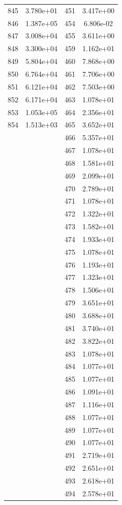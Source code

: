 \documentclass[12pt]{article}
\begin{document}
\begin{longtable}{@{}cccc@{}}
845 & 3.780e+01 & 451 & 3.417e+00 \\
846 & 1.387e+05 & 454 & 6.806e-02 \\
847 & 3.008e+04 & 455 & 3.611e+00 \\
848 & 3.300e+04 & 459 & 1.162e+01 \\
849 & 5.804e+04 & 460 & 7.868e+00 \\
850 & 6.764e+04 & 461 & 7.706e+00 \\
851 & 6.121e+04 & 462 & 7.503e+00 \\
852 & 6.171e+04 & 463 & 1.078e+01 \\
853 & 1.053e+05 & 464 & 2.356e+01 \\
854 & 1.513e+03 & 465 & 3.652e+01 \\
 &  & 466 & 5.357e+01 \\
 &  & 467 & 1.078e+01 \\
 &  & 468 & 1.581e+01 \\
 &  & 469 & 2.099e+01 \\
 &  & 470 & 2.789e+01 \\
 &  & 471 & 1.078e+01 \\
 &  & 472 & 1.322e+01 \\
 &  & 473 & 1.582e+01 \\
 &  & 474 & 1.933e+01 \\
 &  & 475 & 1.078e+01 \\
 &  & 476 & 1.193e+01 \\
 &  & 477 & 1.323e+01 \\
 &  & 478 & 1.506e+01 \\
 &  & 479 & 3.651e+01 \\
 &  & 480 & 3.688e+01 \\
 &  & 481 & 3.740e+01 \\
 &  & 482 & 3.822e+01 \\
 &  & 483 & 1.078e+01 \\
 &  & 484 & 1.077e+01 \\
 &  & 485 & 1.077e+01 \\
 &  & 486 & 1.091e+01 \\
 &  & 487 & 1.116e+01 \\
 &  & 488 & 1.077e+01 \\
 &  & 489 & 1.077e+01 \\
 &  & 490 & 1.077e+01 \\
 &  & 491 & 2.719e+01 \\
 &  & 492 & 2.651e+01 \\
 &  & 493 & 2.618e+01 \\
 &  & 494 & 2.578e+01 \\

\end{longtable}
\end{document}
